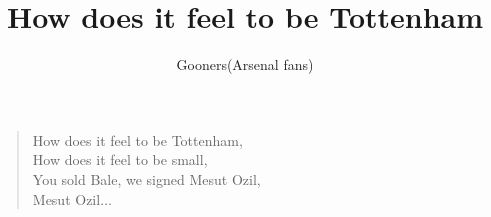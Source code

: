 \documentclass[a4paper,12pt]{article}
\title{How does it feel to be Tottenham}
\author{Gooners(Arsenal fans)}
\date{}
\begin{document}
	
	\maketitle
	
	\begin{verse}
		
		How does it feel to be Tottenham, \\
		How does it feel to be small, \\
		You sold Bale, we signed Mesut Ozil, \\
		Mesut Ozil$\ldots$
		
	\end{verse}
	
\end{document}

